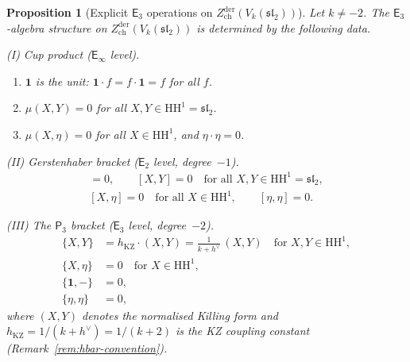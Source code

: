 \documentclass[11pt,reqno]{amsart}
\newtheorem{proposition}[theorem]{Proposition}
\theoremstyle{definition}
\theoremstyle{remark}
\newcommand{\HH}{\mathrm{HH}}
\newcommand{\Etwo}{\mathsf{E}_{2}}
\newcommand{\Ethree}{\mathsf{E}_{3}}
\newcommand{\Einf}{\mathsf{E}_{\infty}}
\newcommand{\Pthree}{\mathsf{P}_{3}}
\numberwithin{equation}{section}
\begin{document}
\begin{proposition}[Explicit $\Ethree$ operations on
$Z^{\mathrm{der}}_{\mathrm{ch}}(V_k(\mathfrak{sl}_2))$]
\label{prop:e3-explicit-sl2}
Let $k \neq -2$.
The $\Ethree$-algebra structure on
$Z^{\mathrm{der}}_{\mathrm{ch}}(V_k(\mathfrak{sl}_2))$
is determined by the following data.

\smallskip
\noindent
\textup{(I) Cup product} ($\Einf$ level).
\begin{enumerate}[label=\textup{(\alph*)}]
\item $\mathbf{1}$ is the unit:
  $\mathbf{1} \cdot f = f \cdot \mathbf{1} = f$ for all $f$.
\item
  $\mu(X, Y) = 0$ for all $X, Y \in \HH^1 = \mathfrak{sl}_2$.
\item
  $\mu(X, \eta) = 0$ for all $X \in \HH^1$, and
  $\eta \cdot \eta = 0$.
\end{enumerate}

\smallskip
\noindent
\textup{(II) Gerstenhaber bracket} ($\Etwo$ level,
degree~$-1$).
\begin{gather*}
  [\mathbf{1}, -] = 0, \qquad
  [X, Y] = 0 \quad \text{for all }
  X, Y \in \HH^1 = \mathfrak{sl}_2, \\
  [X, \eta] = 0 \quad \text{for all } X \in \HH^1,
  \qquad [\eta, \eta] = 0.
\end{gather*}

\smallskip
\noindent
\textup{(III) The $\Pthree$ bracket} ($\Ethree$ level,
degree~$-2$).
\begin{align}
  \label{eq:e3-p3-killing}
  \{X, Y\}
  &= h_{\mathrm{KZ}} \cdot (X, Y)
  = \frac{1}{k + h^\vee}\,(X, Y)
  \quad \text{for } X, Y \in \HH^1,
  \\
  \label{eq:e3-p3-derivation}
  \{X, \eta\}
  &= 0
  \quad \text{for } X \in \HH^1,
  \\
  \label{eq:e3-p3-unit}
  \{\mathbf{1}, -\}
  &= 0,
  \\
  \label{eq:e3-p3-top}
  \{\eta, \eta\}
  &= 0,
\end{align}
where $(X, Y)$ denotes the normalised Killing form
and $h_{\mathrm{KZ}} = 1/(k + h^\vee) = 1/(k + 2)$ is
the KZ coupling constant
\textup{(}Remark~\textup{\ref{rem:hbar-convention}}\textup{)}.
\end{proposition}
\end{document}
